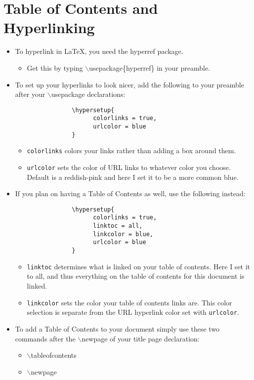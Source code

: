 \documentclass{article}
\begin{document}
	\section{Table of Contents and Hyperlinking}
		\begin{itemize}
			\item To hyperlink in \LaTeX{}, you need the hyperref package.
			\begin{itemize}
				\item Get this by typing $\backslash$usepackage\{hyperref\} in your preamble.
			\end{itemize}
			\item To set up your hyperlinks to look nicer, add the following to your preamble after your $\backslash$usepackage declarations:
			\begin{verbatim}
				\hypersetup{
				      colorlinks = true,
				      urlcolor = blue
				}
			\end{verbatim}
			\begin{itemize}
				\item \texttt{colorlinks} colors your links rather than adding a box around them.
				\item \texttt{urlcolor} sets the color of URL links to whatever color you choose. Default is a reddish-pink and here I set it to be a more common blue.
			\end{itemize}
			\item If you plan on having a Table of Contents as well, use the following instead:
			\begin{verbatim}
				\hypersetup{
				      colorlinks = true,
				      linktoc = all,
				      linkcolor = blue,
				      urlcolor = blue
				}
			\end{verbatim}
			\begin{itemize}
				\item \texttt{linktoc} determines what is linked on your table of contents. Here I set it to all, and thus everything on the table of contents for this document is linked.
				\item \texttt{linkcolor} sets the color your table of contents links are. This color selection is separate from the URL hyperlink color set with \texttt{urlcolor}.
			\end{itemize}
			\item To add a Table of Contents to your document simply use these two commands after the $\backslash$newpage of your title page declaration:
			\begin{itemize}
				\item $\backslash$tableofcontents
				\item $\backslash$newpage
			\end{itemize}
		\end{itemize}
	
\end{document}
